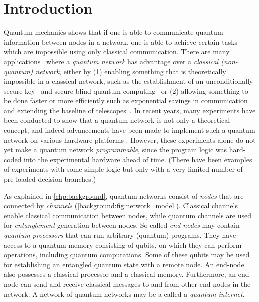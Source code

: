 \section{Introduction}
\label{netqasm:sec:introduction}


Quantum mechanics shows that if one is able to communicate quantum information between nodes in a network, one is able to achieve certain tasks which are impossible using only classical communication.
There are many applications~\cite{Wehner2018stages} where a \emph{quantum network} has advantage over a \emph{classical (non-quantum) network}, either by
(1) enabling something that is theoretically impossible in a classical network, such as the establishment of an unconditionally secure key~\cite{bb84} and secure blind quantum computing~\cite{childs2005assisted} or
(2) allowing something to be done faster or more efficiently such as exponential savings in communication~\cite{Buhrman2010} and extending the baseline of telescopes~\cite{gottesman2012longer}.
In recent years, many experiments have been conducted to show that a quantum network is not only a theoretical concept, and indeed advancements have been made to implement such a quantum network on various hardware platforms \cite{Hensen2015, Humphreys2018, moehring2007entanglement, hofmann2012heralded, Kalb2017, Inlek2017, sangouard2011quantum}.
However, these experiments alone do not yet make a quantum network \textit{programmable}, since the program logic was hard-coded into the experimental hardware ahead of time.
(There have been examples of experiments with some simple logic but only with a very limited number of pre-loaded decision-branches.)

As explained in \cref{chp:background}, quantum networks consist of \textit{nodes} that are connected by \textit{channels} (\cref{background:fig:network_model}).
Classical channels enable classical communication between nodes, while quantum channels are used for \textit{entanglement} generation between nodes.
So-called \textit{end-nodes} may contain \textit{quantum processors} that can run arbitrary (quantum) programs.
They have access to a quantum memory consisting of qubits, on which they can perform operations, including quantum computations.
Some of these qubits may be used for establishing an entangled quantum state with a remote node.
An end-node also possesses a classical processor and a classical memory.
Furthermore, an end-node can send and receive classical messages to and from other end-nodes in the network.
A network of quantum networks may be a called a \textit{quantum internet}.

